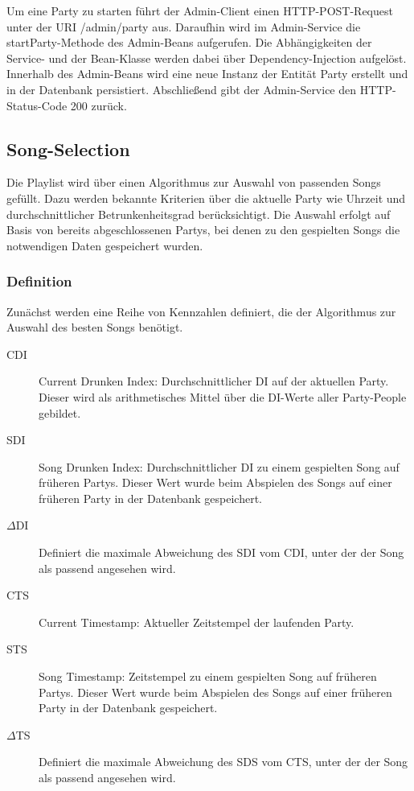Um eine Party zu starten führt der Admin-Client einen HTTP-POST-Request unter der URI /admin/party aus. Daraufhin wird im Admin-Service die startParty-Methode des Admin-Beans aufgerufen. Die Abhängigkeiten der Service- und der Bean-Klasse werden dabei über Dependency-Injection aufgelöst. Innerhalb des Admin-Beans wird eine neue Instanz der Entität Party erstellt und in der Datenbank persistiert. Abschließend gibt der Admin-Service den HTTP-Status-Code 200 zurück.

\subsection{Song-Selection}
\label{sec:SongSelect}
Die Playlist wird über einen Algorithmus zur Auswahl von passenden Songs gefüllt. Dazu werden bekannte Kriterien über die aktuelle Party wie Uhrzeit und durchschnittlicher Betrunkenheitsgrad berücksichtigt. Die Auswahl erfolgt auf Basis von bereits abgeschlossenen Partys, bei denen zu den gespielten Songs die notwendigen Daten gespeichert wurden.

\subsubsection{Definition}
Zunächst werden eine Reihe von Kennzahlen definiert, die der Algorithmus zur Auswahl des besten Songs benötigt.

\begin{description}
	\item[CDI] Current Drunken Index: Durchschnittlicher DI auf der aktuellen Party. Dieser wird als arithmetisches Mittel über die DI-Werte aller Party-People gebildet.
	\item[SDI] Song Drunken Index: Durchschnittlicher DI zu einem gespielten Song auf früheren Partys. Dieser Wert wurde beim Abspielen des Songs auf einer früheren Party in der Datenbank gespeichert.
	\item[$\Delta$DI] Definiert die maximale Abweichung des SDI vom CDI, unter der der Song als passend angesehen wird.
	\item[CTS] Current Timestamp: Aktueller Zeitstempel der laufenden Party.
	\item[STS] Song Timestamp: Zeitstempel zu einem gespielten Song auf früheren Partys. Dieser Wert wurde beim Abspielen des Songs auf einer früheren Party in der Datenbank gespeichert.
	\item[$\Delta$TS] Definiert die maximale Abweichung des SDS vom CTS, unter der der Song als passend angesehen wird.
\end{description}

